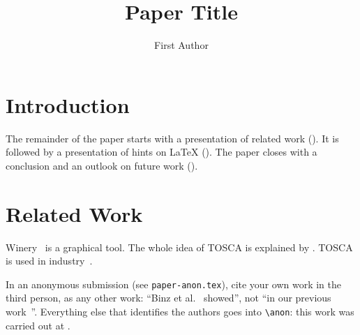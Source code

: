 \ifdefined\directlua
  \usepackage{chickenize}
  \suppressonecharbreak
\fi

\title{Paper Title}
\author{First Author}

\begin{abstract}
\lipsum[1]

\end{abstract}

\maketitle

\section{Introduction}
\label{sec:introduction}
\lipsum[1-3]

The remainder of the paper starts with a presentation of related work ().
It is followed by a presentation of hints on \LaTeX{} ().
The paper closes with a conclusion and an outlook on future work ().

\section{Related Work}
\label{sec:relatedwork}

Winery~\citep{Winery} is a graphical  tool.
The whole idea of TOSCA is explained by \citet{Binz2009}.
TOSCA is used in industry~.

In an anonymous submission (see \texttt{paper-anon.tex}), cite your own work in the third person, as any other work: ``Binz et al.~\cite{Binz2009} showed'', not ``in our previous work~\cite{Binz2009}''.
Everything else that identifies the authors goes into \verb+\anon+: this work was carried out at .

